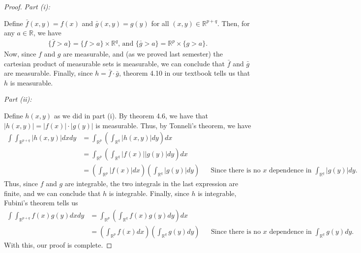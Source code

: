 \documentclass[10pt,a4paper]{article}
\makeatletter
\theoremstyle{theorem}
\newcommand{\proofpart}[2]{%
  \par
  \addvspace{\medskipamount}%
  \noindent\emph{Part #1: #2}\par\nobreak
  \addvspace{\smallskipamount}%
  \@afterheading
}
\theoremstyle{definition}
\makeatother
\begin{document}
\begin{proof}
\proofpart{(i)}{} Define $\bar{f}(x, y) = f(x)$ and $\bar{g}(x, y) = g(y)$ for all $(x, y) \in \mathbb{R}^{p + q}$. Then, for any $a \in \mathbb{R}$, we have
\begin{align*}
\{\bar{f} > a \} = \{f > a \} \times \mathbb{R}^q \text{, and } \{\bar{g} > a \} = \mathbb{R}^p \times \{g > a \}.
\end{align*}
Now, since $f$ and $g$ are measurable, and (as we proved last semester) the cartesian product of measurable sets is measurable, we can conclude that $\bar{f}$ and $\bar{g}$ are measurable. Finally, since $h = \bar{f} \cdot \bar{g}$, theorem 4.10 in our textbook tells us that $h$ is measurable.

\proofpart{(ii)}{} Define $h(x, y)$ as we did in part (i). By theorem 4.6, we have that $|h(x, y)| = |f(x)| \cdot |g(y)|$ is measurable. Thus, by Tonneli's theorem, we have
\begin{align*}
\int \int_{\mathbb{R}^{p + q}} |h(x, y)| dx dy &= \int_{\mathbb{R}^{p}} \left( \int_{\mathbb{R}^{q}} |h(x, y)| dy \right) dx\\
&= \int_{\mathbb{R}^{p}} \left( \int_{\mathbb{R}^{q}} |f(x)||g(y)| dy \right) dx\\
&= \left(\int_{\mathbb{R}^{p}} |f(x)| dx\right) \left( \int_{\mathbb{R}^{q}} |g(y)| dy \right) && \text{Since there is no } x \text{ dependence in } \int_{\mathbb{R}^{q}} |g(y)| dy.
\end{align*}
Thus, since $f$ and $g$ are integrable, the two integrals in the last expression are finite, and we can conclude that $h$ is integrable. Finally, since $h$ is integrable, Fubini's theorem tells us
\begin{align*}
\int \int_{\mathbb{R}^{p + q}} f(x)g(y) dx dy &= \int_{\mathbb{R}^{p}} \left( \int_{\mathbb{R}^{q}} f(x)g(y) dy \right) dx\\
&= \left(\int_{\mathbb{R}^{p}} f(x) dx\right) \left( \int_{\mathbb{R}^{q}} g(y) dy \right)&& \text{Since there is no } x \text{ dependence in } \int_{\mathbb{R}^{q}} g(y) dy.
\end{align*}
With this, our proof is complete.
\end{proof}
\end{document}
